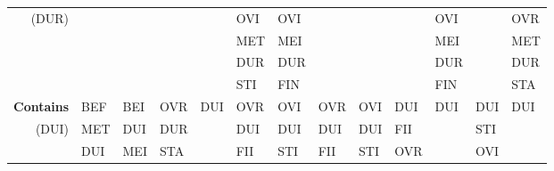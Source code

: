\documentclass[11pt]{report}
\newenvironment{vvarmargin}[2]
{
  \begin{list}{}
  {
    \setlength{\topsep}{0pt}
    \setlength{\leftmargin}{0pt}
    \setlength{\rightmargin}{0pt}
    \setlength{\listparindent}{\parindent}
    \setlength{\itemindent}{\parindent}
    \setlength{\parsep}{0pt plus 1pt}
    \addtolength{\leftmargin}{#1}\addtolength{\rightmargin}{#2}
  }
  \item
}
{
  \end{list}
}
\begin{document}
\begin{table}[p]
\begin{vvarmargin}{-4cm}{-4cm}
\begin{center}
\begin{tabular}[t]{|r|l|l|l|l|l|l|l|l|l|l|l|l|}
                  (DUR)                   &                         &                         &                         &                         & OVI                     & OVI                     &                         &                         &                         & OVI                     &                         & OVR                     \\
                                          &                         &                         &                         &                         & MET                     & MEI                     &                         &                         &                         & MEI                     &                         & MET                     \\
                                          &                         &                         &                         &                         & DUR                     & DUR                     &                         &                         &                         & DUR                     &                         & DUR                     \\
                                          &                         &                         &                         &                         & STI                     & FIN                     &                         &                         &                         & FIN                     &                         & STA                     \\
                  \hline
                  \textbf{Contains}       & BEF                     & BEI                     & OVR                     & DUI                     & OVR                     & OVI                     & OVR                     & OVI                     & DUI                     & DUI                     & DUI                     & DUI                     \\
                  (DUI)                   & MET                     & DUI                     & DUR                     &                         & DUI                     & DUI                     & DUI                     & DUI                     & FII                     &                         & STI                     &                         \\
                                          & DUI                     & MEI                     & STA                     &                         & FII                     & STI                     & FII                     & STI                     & OVR                     &                         & OVI                     &                         \\

\end{tabular}
\end{center}
\end{vvarmargin}
\end{table}
\end{document}
